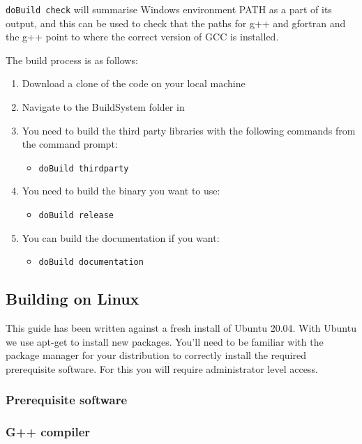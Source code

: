 \texttt{doBuild check} will summarise Windows environment PATH as a part of its output, and this can be used to check that the paths for g++ and gfortran and the g++ point to where the correct version of GCC is installed. 

The build process is as follows: 
\begin{enumerate}
  \item Download a clone of the code on your local machine
  \item Navigate to the BuildSystem folder in 
  \item You need to build the third party libraries with the following commands from the command prompt:
  \begin{itemize}
    \item \texttt{doBuild thirdparty}
  \end{itemize}
  \item You need to build the binary you want to use:
  \begin{itemize}
    \item \texttt{doBuild release}
  \end{itemize}
  \item You can build the documentation if you want:
  \begin{itemize}
    \item \texttt{doBuild documentation}
  \end{itemize}
\end{enumerate}

\subsection{Building on Linux}

This guide has been written against a fresh install of Ubuntu 20.04. With Ubuntu we use apt-get to install new packages. You’ll need to be familiar with the package manager for your distribution to correctly install the required prerequisite software. For this you will require administrator level access.

\subsubsection{Prerequisite software}

\subsubsection*{G++ compiler}

